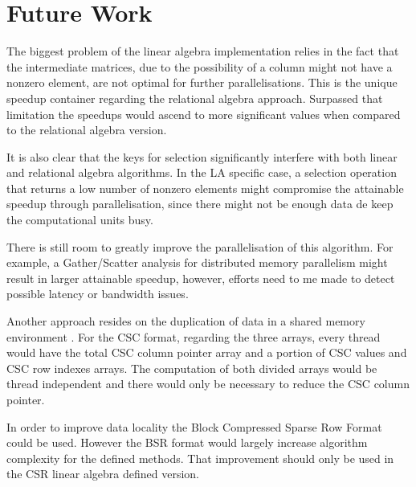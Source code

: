 \section{Future Work}
\label{future_work}
\indent


The biggest problem of the linear algebra implementation relies in the fact that the intermediate matrices, due to the possibility of a column might not have a nonzero element, are not optimal for further parallelisations. This is the unique speedup container regarding the relational algebra approach. Surpassed that limitation the speedups would ascend to more significant values when compared to the relational algebra version. \par 
It is also clear that the keys for selection significantly interfere with both linear and relational algebra algorithms. In the LA specific case, a selection operation that returns a low number of nonzero elements might compromise the attainable speedup through parallelisation, since there might not be enough data de keep the computational units busy. \par 

There is still room to greatly improve the parallelisation of
this algorithm. For example,  a Gather/Scatter analysis for distributed memory parallelism might result in larger attainable speedup, however, efforts need to me made to detect possible latency or bandwidth issues. \par 
Another approach resides on the duplication of data in a shared memory environment . For the CSC format, regarding the three arrays, every thread would have the total CSC column pointer array and a portion of CSC values and CSC row indexes arrays. The computation of both divided arrays would be thread independent and there would only be necessary to reduce the CSC column pointer. \par 

In order to improve data locality the Block Compressed Sparse Row Format could be used. However the BSR format would largely increase algorithm complexity for the defined methods. That improvement should only be used in the CSR linear algebra defined version.\par 

